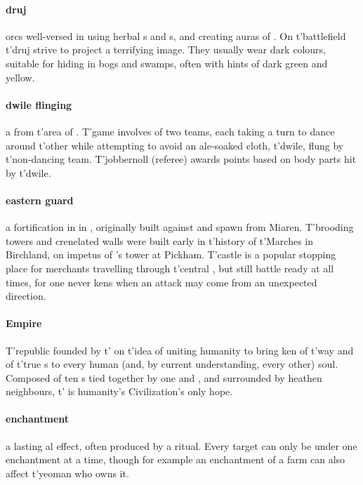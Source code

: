 \paragraph{druj}  orcs well-versed in using herbal s and s, and creating auras of . On t'\allowbreak battlefield t'\allowbreak druj strive to project a terrifying image. They usually wear dark colours, suitable for hiding in bogs and swamps, often with hints of dark green and yellow.
\paragraph{dwile flinging} a  from t'\allowbreak area of . T'game involves of two teams, each taking a turn to dance around t'\allowbreak other while attempting to avoid an ale-soaked cloth, t'\allowbreak dwile, flung by t'\allowbreak non-dancing team. T'jobbernoll (referee) awards points based on body parts hit by t'\allowbreak dwile.
\paragraph{eastern guard} a fortification in  in , originally built against  and spawn from Miaren. T'brooding towers and crenelated walls were built early in t'\allowbreak history of t'\allowbreak Marches in Birchland, on impetus of 's tower at Pickham. T'castle is a popular stopping place for merchants travelling through t'\allowbreak central , but still battle ready at all times, for one never kens when an attack may come from an unexpected direction. 
\paragraph{Empire} T'republic founded by t'\allowbreak {} on t'\allowbreak idea of uniting humanity to bring ken of t'\allowbreak way and of t'\allowbreak true s to every human (and, by current understanding, every other) soul. Composed of ten s tied together by one  and , and surrounded by heathen neighbours, t'\allowbreak {} is humanity's Civilization's only hope.
\paragraph{enchantment} a lasting al effect, often produced by a ritual. Every target can only be under one enchantment at a time, though for example an enchantment of a farm can also affect t'\allowbreak yeoman who owns it.
